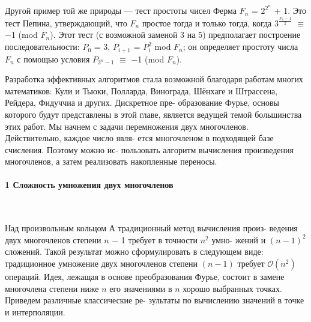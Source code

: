 \vspace{3pt} Другой пример той же природы — тест простоты чисел Ферма \linebreak
 $F_n$ = $2^{2^n}$ + 1. Это тест Пепина, утверждающий, что  $F_n$ простое тогда \linebreak
и только тогда, когда $3^{\frac{F_n - 1}{2}}$ $\equiv$ $-$1 (mod $F_n$). Этот тест (с возможной \linebreak
заменой 3 на 5) предполагает построение последовательности:  $P_0$ = 3, \linebreak
 $P_{i + 1}$ =  $P_i^2$ mod $F_n$; он определяет простоту числа $F_n$ с помощью условия \linebreak
 $P_{2^n - 1}$ $\equiv$ $-$1 (mod $F_n$). \ 

\vspace{3pt} Разработка эффективных алгоритмов стала возможной благодаря \linebreak
работам многих математиков: Кули и Тьюки, Полларда, Винограда, \linebreak
Шёнхаге и Штрассена, Рейдера, Фидуччиа и других. Дискретное пре­- \linebreak
образование Фурье, основы которого будут представлены в этой главе, \linebreak
является ведущей темой большинства этих работ. Мы начнем с задачи \linebreak
перемножения двух многочленов. Действительно, каждое число явля­- \linebreak
ется многочленом в подходящей базе счисления. Поэтому можно ис­- \linebreak
пользовать алгоритм вычисления произведения многочленов, а затем \linebreak
реализовать накопленные переносы. \newline

\paragraph{\large 1 Сложность умножения двух многочленов} \ 

\vspace{15pt}\normalsize \noindent Над произвольным кольцом $А$ традиционный метод вычисления произ­- \linebreak
ведения двух многочленов степени $n$ $-$ 1 требует в точности $n^2$ умн­о- \linebreak
жений и $(n - 1)^2$ сложений. Такой результат можно сформулировать в \linebreak
следующем виде: традиционное умножение двух многочленов степени \linebreak
$(n - 1)$ требует $\mathcal{O}(n^2)$ операций. Идея, лежащая в основе преобразования \linebreak
Фурье, состоит в замене многочлена степени ниже $n$ его значениями \linebreak
в $n$ хорошо выбранных точках. Приведем различные классические ре­- \linebreak
зультаты по вычислению значений в точке и интерполяции.

